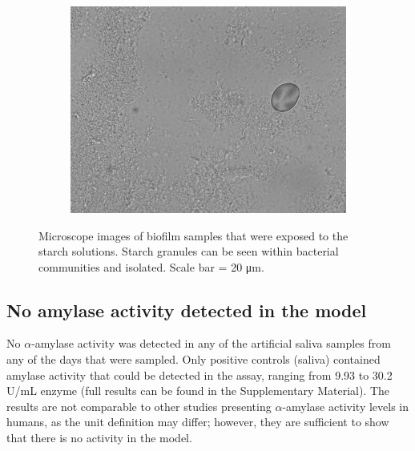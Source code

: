 \documentclass[
  b5paper,
]{book}
\begin{document}
\begin{figure}
\begin{minipage}[t]{0.50\linewidth}
{}

\end{minipage}%
%
\begin{minipage}[t]{0.50\linewidth}

{\centering 

\begin{figure}[H]

{\centering \includegraphics[width=4.63in,height=\textheight]{figures/2D2-potato.jpg}

}

\end{figure}

}

\end{minipage}%

\caption{\label{fig-microscope}Microscope images of biofilm samples that
were exposed to the starch solutions. Starch granules can be seen within
bacterial communities and isolated. Scale bar = 20 μm.}

\end{figure}

\hypertarget{no-amylase-activity-detected-in-the-model}{%
\subsection{No amylase activity detected in the
model}\label{no-amylase-activity-detected-in-the-model}}

No \(\alpha\)-amylase activity was detected in any of the artificial
saliva samples from any of the days that were sampled. Only positive
controls (saliva) contained amylase activity that could be detected in
the assay, ranging from 9.93 to 30.2 U/mL enzyme (full results can be
found in the Supplementary Material). The results are not comparable to
other studies presenting \(\alpha\)-amylase activity levels in humans,
as the unit definition may differ; however, they are sufficient to show
that there is no activity in the model.
\end{document}
